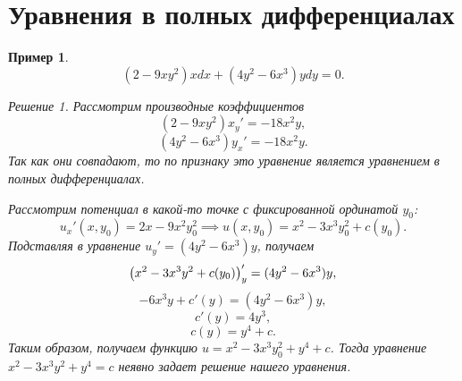 \documentclass[a5paper, 11pt]{article}
\theoremstyle{definition}
\theoremstyle{plain}
\newtheorem{Ex}{Пример}
\theoremstyle{remark}
\newtheorem*{Solution}{Решение}
\begin{document}
	\section[30.09.2022]{Уравнения в полных дифференциалах}
	\begin{Ex}
		\[
		(2-9xy^2)xdx + (4y^2-6x^3)ydy = 0.
		\]
		\begin{Solution}
			Рассмотрим производные коэффициентов
			\[
			(2-9xy^2)x_y' = -18x^2y,
			\]
			\[
			(4y^2-6x^3)y_x' = -18x^2y.
			\]
			Так как они совпадают, то по признаку это уравнение является уравнением в полных дифференциалах.
			
			Рассмотрим потенциал в какой-то точке с фиксированной ординатой $y_0$:
			\[
			u_x'(x,y_0) = 2x-9x^2y_0^2 \implies u(x, y_0) = x^2-3 x^3 y_0^2 +c(y_0) .
			\]
			Подставляя в уравнение $u_y' = (4y^2-6x^3)y$, получаем
			\[
			\left(x^2-3 x^3 y^2 + c(y_0)\right)_y' = (4y^2-6x^3)y,
			\]
			\[
			-6x^3y + c'(y) = (4y^2-6x^3)y,
			\]
			\[
			c'(y) = 4y^3,
			\]
			\[
			c(y) = y^4+c.
			\]
			Таким образом, получаем функцию $u=x^2-3 x^3 y_0^2 + y^4+c$. Тогда уравнение $x^2-3 x^3 y^2 + y^4 = c$ неявно задает решение нашего уравнения.
		\end{Solution}
	\end{Ex}
	
\end{document}
